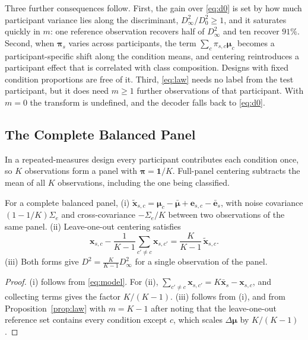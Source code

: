 Three further consequences follow. First, the gain over \eqref{eq:d0} is set by how much participant variance lies along the discriminant, $D_\infty^2/D_0^2\ge1$, and it saturates quickly in $m$: one reference observation recovers half of $D_\infty^2$ and ten recover $91\%$. Second, when $\boldsymbol\pi_s$ varies across participants, the term $\sum_c\pi_{s,c}\boldsymbol\mu_c$ becomes a participant-specific shift along the condition means, and centering reintroduces a participant effect that is correlated with class composition. Designs with fixed condition proportions are free of it. Third, \eqref{eq:law} needs no label from the test participant, but it does need $m\ge1$ further observations of that participant. With $m=0$ the transform is undefined, and the decoder falls back to \eqref{eq:d0}.

\subsection{The Complete Balanced Panel}
In a repeated-measures design every participant contributes each condition once, so $K$ observations form a panel with $\boldsymbol\pi=\mathbf{1}/K$. Full-panel centering subtracts the mean of all $K$ observations, including the one being classified.

\begin{proposition}\label{prop:panel}
For a complete balanced panel, (i) $\tilde{\mathbf{x}}_{s,c}=\boldsymbol\mu_c-\bar{\boldsymbol\mu}+\mathbf{e}_{s,c}-\bar{\mathbf{e}}_s$, with noise covariance $(1-1/K)\Sigma_e$ and cross-covariance $-\Sigma_e/K$ between two observations of the same panel. (ii) Leave-one-out centering satisfies
\begin{equation}
\mathbf{x}_{s,c}-\frac{1}{K-1}\sum_{c'\ne c}\mathbf{x}_{s,c'}=\frac{K}{K-1}\,\tilde{\mathbf{x}}_{s,c}. \label{eq:loo}
\end{equation}
(iii) Both forms give $D^2=\frac{K}{K-1}D_\infty^2$ for a single observation of the panel.
\end{proposition}
\begin{proof}
(i) follows from \eqref{eq:model}. For (ii), $\sum_{c'\ne c}\mathbf{x}_{s,c'}=K\bar{\mathbf{x}}_s-\mathbf{x}_{s,c}$, and collecting terms gives the factor $K/(K-1)$. (iii) follows from (i), and from Proposition~\ref{prop:law} with $m=K-1$ after noting that the leave-one-out reference set contains every condition except $c$, which scales $\Delta\boldsymbol\mu$ by $K/(K-1)$.
\end{proof}

